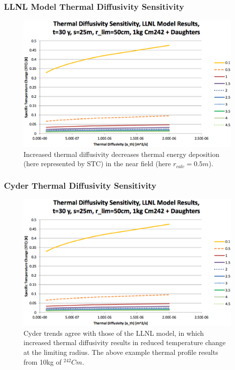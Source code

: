 
\begin{frame}[ctb!]
\frametitle{LLNL Model Thermal Diffusivity Sensitivity}
\begin{figure}[htbp!]
\begin{center}
\includegraphics[height=0.7\textheight]{./thermal_demonstration/diffusivity/diffusivity.eps}
\end{center}
\caption[$K_{th}$ Sensitivity to $\alpha_{th}$]{Increased thermal 
diffusivity decreases thermal energy deposition (here represented by STC) in 
the near field (here $r_{calc} = 0.5m$).}
\label{fig:Cm242alpha_kth_low}
\end{figure}
\end{frame}

\begin{frame}[ctb!]
\frametitle{Cyder Thermal Diffusivity Sensitivity}
\begin{figure}[htbp!]
\begin{center}
\includegraphics[height=0.7\textheight]{./thermal_demonstration/diffusivity/diffusivity.eps}
\caption[$\alpha_{th}$ Sensitivity in Cyder]{Cyder trends agree with those of 
the LLNL model, in which increased thermal diffusivity results in reduced 
temperature change at the limiting radius. The above example thermal profile 
results from 10kg of $^{242}Cm$.} 
\label{fig:ar}
\end{center}
\end{figure}
\end{frame}

